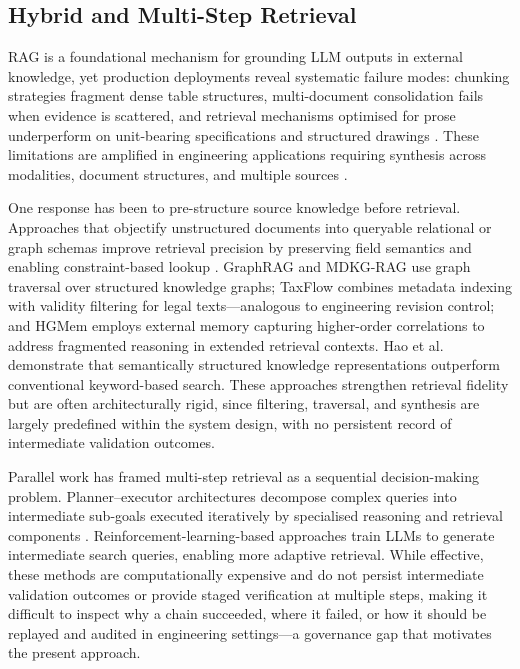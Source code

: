 \documentclass[largeformat]{interact}
\begin{document}
\subsection{Hybrid and Multi-Step Retrieval}
\label{sec:hybrid_multistep_retrieval}
RAG \cite{lewis2020rag} is a foundational mechanism for grounding LLM outputs in
external knowledge, yet production deployments reveal systematic failure modes:
chunking strategies fragment dense table structures, multi-document consolidation
fails when evidence is scattered, and retrieval mechanisms optimised for prose
underperform on unit-bearing specifications and structured drawings
\cite{barnett2024seven}. These limitations are amplified in engineering
applications requiring synthesis across modalities, document structures, and
multiple sources \cite{gao2023retrieval, xie2026agentframework}.

One response has been to pre-structure source knowledge before retrieval.
Approaches that objectify unstructured documents into queryable relational or
graph schemas improve retrieval precision by preserving field semantics and
enabling constraint-based lookup \cite{aster2024langchainsql}. GraphRAG
\cite{mondal2025} and MDKG-RAG \cite{zhang2025} use graph traversal over
structured knowledge graphs; TaxFlow \cite{Karna31122026} combines metadata
indexing with validity filtering for legal texts---analogous to engineering
revision control; and HGMem \cite{zhou2026} employs external memory capturing
higher-order correlations to address fragmented reasoning in extended retrieval
contexts. Hao et al.~\cite{hao2021} demonstrate that semantically structured
knowledge representations outperform conventional keyword-based search. These
approaches strengthen retrieval fidelity but are often architecturally rigid,
since filtering, traversal, and synthesis are largely predefined within the
system design, with no persistent record of intermediate validation outcomes.

Parallel work has framed multi-step retrieval as a sequential decision-making problem. Planner--executor architectures decompose complex queries into intermediate sub-goals executed iteratively by specialised reasoning and retrieval components \cite{Liu2025OPERAAR}. Reinforcement-learning-based approaches \cite{Song2025R1SearcherIT, jin2025searchr, zhang2024beam, sorokin2026qrag} train LLMs to generate intermediate search queries, enabling more adaptive retrieval. While effective, these methods are computationally expensive and do not persist intermediate validation outcomes or provide staged verification at multiple steps, making it difficult to inspect why a chain succeeded, where it failed, or how it should be replayed and audited in engineering settings---a governance gap that motivates the present approach.
\end{document}
